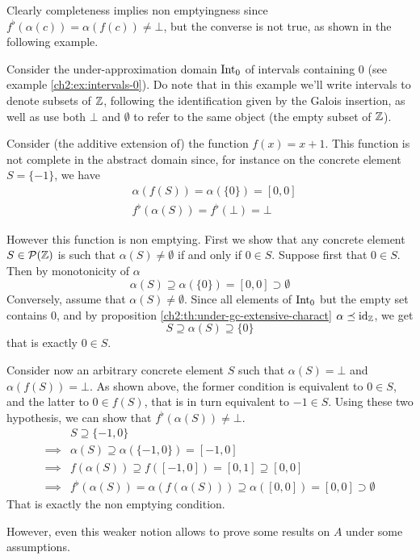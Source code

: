 Clearly completeness implies non emptyingness since $f^{\flat}(\alpha(c)) = \alpha(f(c)) \neq \bot$, but the converse is not true, as shown in the following example.
\begin{example}
	Consider the under-approximation domain $\text{Int}_0$ of intervals containing $0$ (see example \ref{ch2:ex:intervals-0}). Do note that in this example we'll write intervals to denote subsets of $\mathbb{Z}$, following the identification given by the Galois insertion, as well as use both $\bot$ and $\emptyset$ to refer to the same object (the empty subset of $\mathbb{Z}$).

	Consider (the additive extension of) the function $f(x) = x + 1$. This function is not complete in the abstract domain since, for instance on the concrete element $S = \{ -1 \}$, we have
	\begin{align*}
		&\alpha(f(S)) = \alpha(\{ 0 \}) = [0, 0] \\
		&f^{\flat}(\alpha(S)) = f^{\flat}(\bot) = \bot
	\end{align*}

	However this function is non emptying.
	First we show that any concrete element $S \in \mathcal{P}(\mathbb{Z})$ is such that $\alpha(S) \neq \emptyset$ if and only if $0 \in S$.
	Suppose first that $0 \in S$. Then by monotonicity of $\alpha$
	\[
	\alpha(S) \supseteq \alpha(\{ 0 \}) = [0, 0] \supset \emptyset
	\]
	Conversely, assume that $\alpha(S) \neq \emptyset$. Since all elements of $\text{Int}_0$ but the empty set contains $0$, and by proposition \ref{ch2:th:under-gc-extensive-charact} $\alpha \preceq \text{id}_{\mathbb{Z}}$, we get
	\[
	S \supseteq \alpha(S) \supseteq \{ 0 \}
	\]
	that is exactly $0 \in S$.

	Consider now an arbitrary concrete element $S$ such that $\alpha(S) = \bot$ and $\alpha(f(S)) = \bot$. As shown above, the former condition is equivalent to $0 \in S$, and the latter to $0 \in f(S)$, that is in turn equivalent to $-1 \in S$. Using these two hypothesis, we can show that $f^{\flat}(\alpha(S)) \neq \bot$.
	\begin{align*}
		&S \supseteq \{ -1, 0 \} \\
		\implies& \alpha(S) \supseteq \alpha(\{ -1, 0 \}) = [-1, 0] \\
		\implies& f(\alpha(S)) \supseteq f([-1, 0]) = [0, 1] \supseteq [0, 0] \\
		\implies& f^{\flat}(\alpha(S)) = \alpha(f(\alpha(S))) \supseteq \alpha([0, 0]) = [0, 0] \supset \emptyset
	\end{align*}
	That is exactly the non emptying condition.
\end{example}
However, even this weaker notion allows to prove some results on $A$ under some assumptions.

